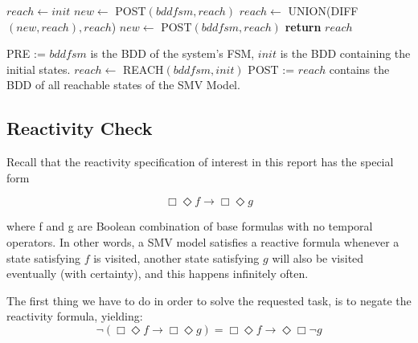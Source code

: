 \begin{algorithmic}[1]
    \State $reach\leftarrow init$
    \State $new\leftarrow$ POST$(bddfsm, reach)$
        \State $reach\leftarrow$ UNION(DIFF$(new, reach),reach$)
        \State $new\leftarrow$ POST$(bddfsm, reach)$
    \EndWhile
    \State \textbf{return }$reach$
\EndFunction
\item[]
\State PRE := $bddfsm$ is the BDD of the system's FSM, $init$ is the BDD containing the initial states.
\State $reach\leftarrow$ REACH$(bddfsm, init)$
\State POST := $reach$ contains the BDD of all reachable states of the SMV Model.
\end{algorithmic}

\subsection{Reactivity Check}

Recall that the reactivity specification of interest in this report has the special form

\[ \Box\Diamond f \rightarrow \Box\Diamond g\]

where f and g are Boolean combination of base formulas with no temporal operators. In other words, a SMV model satisfies a reactive formula whenever a state satisfying $f$ is visited, another state satisfying $g$ will also be visited eventually (with certainty), and this happens infinitely often. \newline 

The first thing we have to do in order to solve the requested task, is to negate the reactivity formula, yielding:
\[ \neg(\Box\Diamond f\rightarrow \Box\Diamond g) = \Box\Diamond f\rightarrow \Diamond\Box \neg g \]

